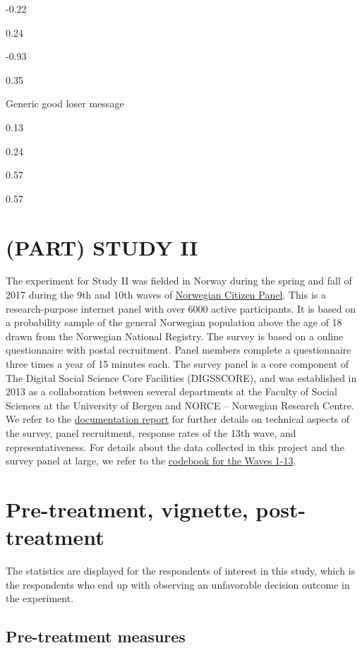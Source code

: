 \documentclass[
]{book}
\begin{document}
-0.22

0.24

-0.93

0.35

Generic good loser message

0.13

0.24

0.57

0.57

\hypertarget{part-study-ii}{%
\chapter{(PART) STUDY II}\label{part-study-ii}}

The experiment for Study II was fielded in Norway during the spring and
fall of 2017 during the 9th and 10th waves of
\href{https://www.uib.no/medborger}{Norwegian Citizen Panel}. This is a
research-purpose internet panel with over 6000 active participants. It
is based on a probability sample of the general Norwegian population
above the age of 18 drawn from the Norwegian National Registry. The
survey is based on a online questionnaire with postal recruitment. Panel
members complete a questionnaire three times a year of 15 minutes each.
The survey panel is a core component of The Digital Social Science Core
Facilities (DIGSSCORE), and was established in 2013 as a collaboration
between several departments at the Faculty of Social Sciences at the
University of Bergen and NORCE -- Norwegian Research Centre. We refer to
the \href{Data/ncp-wave13-documentation.pdf}{documentation report} for
further details on technical aspects of the survey, panel recruitment,
response rates of the 13th wave, and representativeness. For details
about the data collected in this project and the survey panel at large,
we refer to the \href{Data/ncp-wave13-codebook.pdf}{codebook for the
Waves 1-13}.

\hypertarget{pre-treatment-vignette-post-treatment}{%
\chapter{Pre-treatment, vignette,
post-treatment}\label{pre-treatment-vignette-post-treatment}}

The statistics are displayed for the respondents of interest in this
study, which is the respondents who end up with observing an unfavorable
decision outcome in the experiment.

\hypertarget{pre-treatment-measures-1}{%
\section{Pre-treatment measures}\label{pre-treatment-measures-1}}
\end{document}
